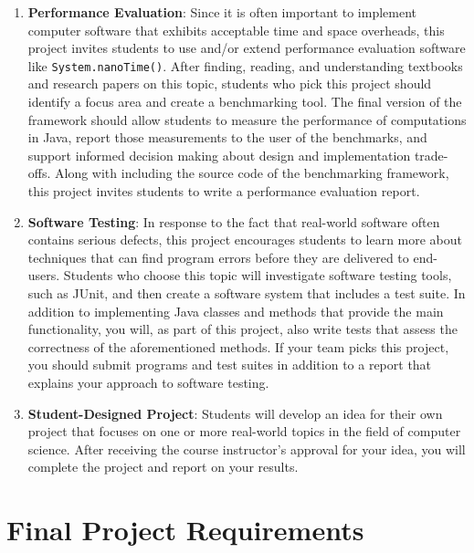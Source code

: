\documentclass[11pt]{article}
\newcommand{\program}[1]{\lstinline{#1}}
\begin{document}
\begin{enumerate}
  \item {\bf Performance Evaluation}: Since it is often important to implement computer software that exhibits
    acceptable time and space overheads, this project invites students to use and/or extend performance evaluation
    software like \program{System.nanoTime()}. After finding, reading, and understanding textbooks and research papers
    on this topic, students who pick this project should identify a focus area and create a benchmarking tool. The final
    version of the framework should allow students to measure the performance of computations in Java, report those
    measurements to the user of the benchmarks, and support informed decision making about design and implementation
    trade-offs. Along with including the source code of the benchmarking framework, this project invites students to
    write a performance evaluation report.

  \item {\bf Software Testing}: In response to the fact that real-world software often contains serious defects, this
    project encourages students to learn more about techniques that can find program errors before they are delivered to
    end-users. Students who choose this topic will investigate software testing tools, such as JUnit, and then create
    a software system that includes a test suite. In addition to implementing Java classes and methods that provide the
    main functionality, you will, as part of this project, also write tests that assess the correctness of the
    aforementioned methods. If your team picks this project, you should submit programs and test suites in
    addition to a report that explains your approach to software testing.

  \item {\bf Student-Designed Project}: Students will develop an idea for their own project that focuses on one or more
    real-world topics in the field of computer science. After receiving the course instructor's approval for your idea,
    you will complete the project and report on your results.

\end{enumerate}

\section*{Final Project Requirements}
\end{document}

